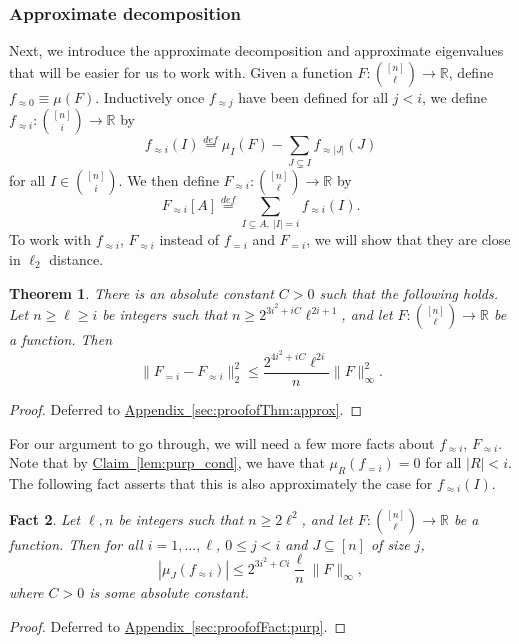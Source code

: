 \documentclass[11pt]{article}
\newcommand{\expref}[2]{\texorpdfstring{\hyperref[#2]{#1~\ref{#2}}}{#1~\ref{#2}}}
\newtheorem{theorem}{Theorem}[section]
\newtheorem{fact}[theorem]{Fact}
\newcommand\card[1]{\left| {#1} \right|}
\newcommand\norm[1]{\| #1 \|}
\newcommand\defeq{\stackrel{def}{=}}
\renewcommand\geq{\geqslant}
\renewcommand\leq{\leqslant}
\newcommand\lvlfn[2]{{#1}_{={#2}}}
\newcommand\approxlvlfn[2]{{#1}_{\approx{#2}}}
\begin{document}
\subsubsection{Approximate decomposition}
Next, we introduce the approximate decomposition and approximate eigenvalues that will be easier for us to work with.
Given a function $F\colon {[n] \choose \ell}\to\mathbb{R}$,
define $\approxlvlfn{f}{0}\equiv \mu(F)$. Inductively once
$\approxlvlfn{f}{j}$ have been defined for all $j<i$, we define $\approxlvlfn{f}{i}\colon {[n]\choose i}\to\mathbb{R}$ by
\[
\approxlvlfn{f}{i}(I) \defeq \mu_{I}(F) - \sum\limits_{J\subsetneq I}{\approxlvlfn{f}{\card{J}}(J)}
\]
for all $I\in {[n] \choose i}$. We then define $\approxlvlfn{F}{i}\colon \binom{[n]}{\ell}\to\mathbb{R}$ by %
\[
\approxlvlfn{F}{i}[A] \defeq \sum\limits_{I\subseteq A,~\card{I} = i}{\approxlvlfn{f}{i}(I)}.
\]
To work with $\approxlvlfn{f}{i}$, $\approxlvlfn{F}{i}$ instead of $\lvlfn{f}{i}$ and $\lvlfn{F}{i}$, we will show that they are close in $\ell_{2}$ distance.
\begin{theorem}\label{thm:approx}
There is an absolute %
constant $C>0$ such that the following holds.
Let $n\geq \ell\geq i$ be integers such that $n\geq 2^{3i^2+iC} \ell^{2i+1}$, and let
$F\colon {[n]\choose \ell}\to\mathbb{R}$ be a function. Then
\[
\norm{\lvlfn{F}{i}-\approxlvlfn{F}{i}}_{2}^2
\leq \frac{2^{4i^2+iC} \ell^{2i}}{n} \norm{F}_{\infty}^2.
\]
\end{theorem}
\begin{proof}
  Deferred to %
  \expref{Appendix}{sec:proofofThm:approx}.   %
\end{proof}


For our argument to go through, we will need a few more facts %
about $\approxlvlfn{f}{i}$, $\approxlvlfn{F}{i}$.
Note that by \expref{Claim}{lem:purp_cond}, we have that $\mu_R(\lvlfn{f}{i}) = 0$ for all $\card{R} < i$. The following
fact asserts that this is also approximately the case for $\approxlvlfn{f}{i}(I)$.
\begin{fact}\label{fact:purp}
Let $\ell, n$ be integers such that $n\geq 2\ell^2$, and let
$F\colon {[n]\choose \ell}\to\mathbb{R}$ be a function.
Then for all $i=1,...,\ell$, $0\leq j<i$ and $J\subseteq [n]$ of size $j$,
\[
\card{\mu_J(\approxlvlfn{f}{i})}%
\leq 2^{3i^2 + Ci} \frac{\ell}{n} \norm{F}_{\infty},
\]
where $C>0$ is some absolute constant.
\end{fact}
\begin{proof}
  Deferred to %
  \expref{Appendix}{sec:proofofFact:purp}.   %
\end{proof}
\end{document}
